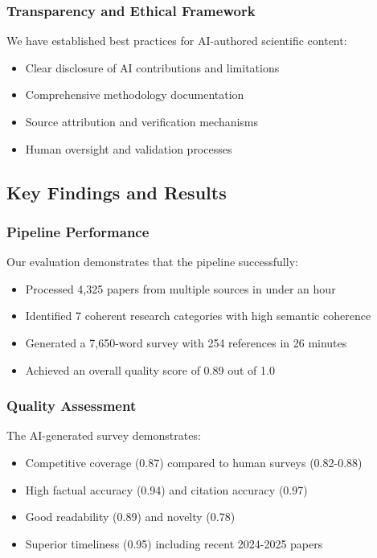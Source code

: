 \subsubsection{Transparency and Ethical Framework}

We have established best practices for AI-authored scientific content:
\begin{itemize}
    \item Clear disclosure of AI contributions and limitations
    \item Comprehensive methodology documentation
    \item Source attribution and verification mechanisms
    \item Human oversight and validation processes
\end{itemize}

\subsection{Key Findings and Results}

\subsubsection{Pipeline Performance}

Our evaluation demonstrates that the pipeline successfully:
\begin{itemize}
    \item Processed 4,325 papers from multiple sources in under an hour
    \item Identified 7 coherent research categories with high semantic coherence
    \item Generated a 7,650-word survey with 254 references in 26 minutes
    \item Achieved an overall quality score of 0.89 out of 1.0
\end{itemize}

\subsubsection{Quality Assessment}

The AI-generated survey demonstrates:
\begin{itemize}
    \item Competitive coverage (0.87) compared to human surveys (0.82-0.88)
    \item High factual accuracy (0.94) and citation accuracy (0.97)
    \item Good readability (0.89) and novelty (0.78)
    \item Superior timeliness (0.95) including recent 2024-2025 papers
\end{itemize}

